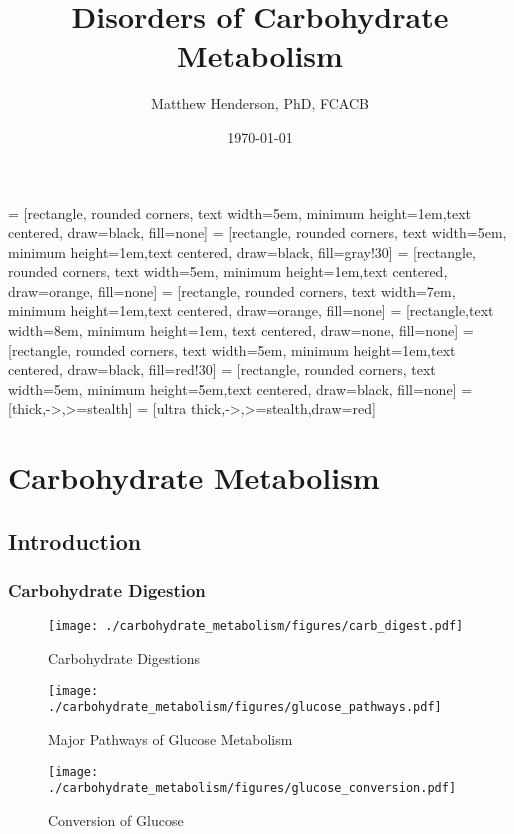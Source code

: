\documentclass{scrartcl}
\author{Matthew Henderson, PhD, FCACB}
\date{\today}
\title{Disorders of Carbohydrate Metabolism}
\begin{document}
\maketitle
\setcounter{tocdepth}{2}
\tableofcontents


 = [rectangle, rounded corners, text width=5em, minimum height=1em,text centered, draw=black, fill=none]
 = [rectangle, rounded corners, text width=5em, minimum height=1em,text centered, draw=black, fill=gray!30]
 = [rectangle, rounded corners, text width=5em, minimum height=1em,text centered, draw=orange, fill=none]
 = [rectangle, rounded corners, text width=7em, minimum height=1em,text centered, draw=orange, fill=none]
 = [rectangle,text width=8em, minimum height=1em, text centered, draw=none, fill=none]
 = [rectangle, rounded corners, text width=5em, minimum height=1em,text centered, draw=black, fill=red!30]
 = [rectangle, rounded corners, text width=5em, minimum height=5em,text centered, draw=black, fill=none]
 = [thick,->,>=stealth]
 = [ultra thick,->,>=stealth,draw=red]


\section{Carbohydrate Metabolism}
\label{sec:orga6175bf}
\subsection{Introduction}
\label{sec:org8aa08e3}
\subsubsection{Carbohydrate Digestion}
\label{sec:orgf6f9ea3}
\begin{figure}[htbp]
\centering
\texttt{[image: ./carbohydrate\_metabolism/figures/carb\_digest.pdf]}
\caption{\label{fig:orgcbf0a22}
Carbohydrate Digestions}
\end{figure}

\begin{figure}[htbp]
\centering
\texttt{[image: ./carbohydrate\_metabolism/figures/glucose\_pathways.pdf]}
\caption{\label{fig:org9274998}
Major Pathways of Glucose Metabolism}
\end{figure}

\begin{figure}[htbp]
\centering
\texttt{[image: ./carbohydrate\_metabolism/figures/glucose\_conversion.pdf]}
\caption{\label{fig:org67628da}
Conversion of Glucose}
\end{figure}
\end{document}
